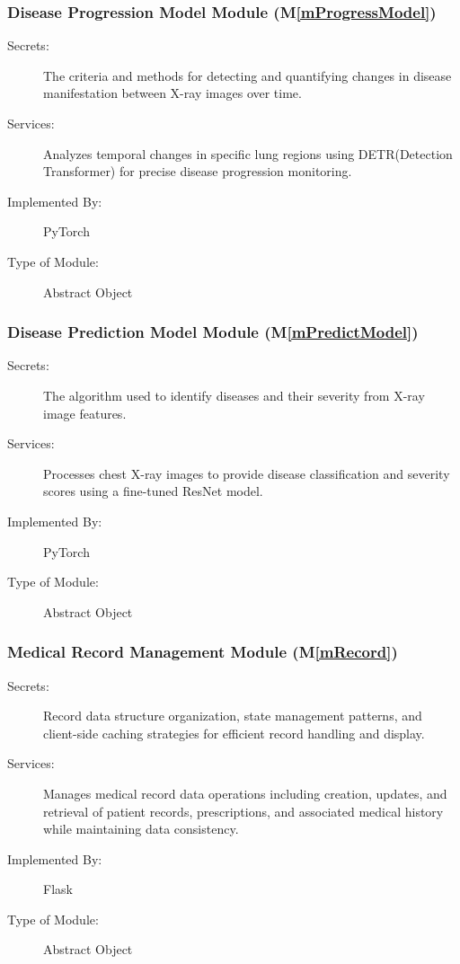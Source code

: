 \documentclass[12pt, titlepage]{article}
\newcommand{\mref}[1]{M\ref{#1}}
\begin{document}
\subsubsection{Disease Progression Model Module (\mref{mProgressModel})}
\begin{description}
\item[Secrets:] The criteria and methods for detecting and quantifying changes in disease manifestation between X-ray images over time.
\item[Services:] Analyzes temporal changes in specific lung regions using DETR(Detection Transformer) for precise disease progression monitoring.
\item[Implemented By:] PyTorch
\item[Type of Module:] Abstract Object
\end{description}

\subsubsection{Disease Prediction Model Module (\mref{mPredictModel})}
\begin{description}
\item[Secrets:] The algorithm used to identify diseases and their severity from X-ray image features.
\item[Services:] Processes chest X-ray images to provide disease classification and severity scores using a fine-tuned ResNet model.
\item[Implemented By:] PyTorch
\item[Type of Module:] Abstract Object
\end{description}

\subsubsection{Medical Record Management Module (\mref{mRecord})}
\begin{description}
\item[Secrets:] Record data structure organization, state management patterns, and client-side caching strategies for efficient record handling and display.
\item[Services:] Manages medical record data operations including creation, updates, and retrieval of patient records, prescriptions, and associated medical history while maintaining data consistency.
\item[Implemented By:] Flask
\item[Type of Module:] Abstract Object
\end{description}
\end{document}
